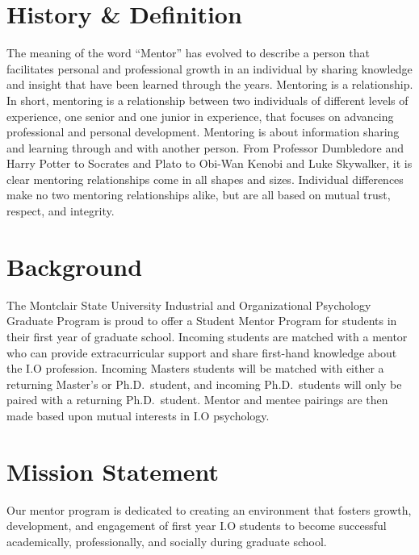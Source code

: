 \documentclass[
  openany]{book}
\begin{document}
\hypertarget{history-definition}{%
\section{History \& Definition}\label{history-definition}}

The meaning of the word ``Mentor'' has evolved to describe a person that facilitates personal and professional growth in an individual by sharing knowledge and insight that have been learned through the years. Mentoring is a relationship. In short, mentoring is a relationship between two individuals of different levels of experience, one senior and one junior in experience, that focuses on advancing professional and personal development. Mentoring is about information sharing and learning through and with another person. From Professor Dumbledore and Harry Potter to Socrates and Plato to Obi-Wan Kenobi and Luke Skywalker, it is clear mentoring relationships come in all shapes and sizes. Individual differences make no two mentoring relationships alike, but are all based on mutual trust, respect, and integrity.

\hypertarget{background}{%
\section{Background}\label{background}}

The Montclair State University Industrial and Organizational Psychology Graduate Program is proud to offer a Student Mentor Program for students in their first year of graduate school. Incoming students are matched with a mentor who can provide extracurricular support and share first-hand knowledge about the I.O profession. Incoming Masters students will be matched with either a returning Master's or Ph.D.~student, and incoming Ph.D.~students will only be paired with a returning Ph.D.~student. Mentor and mentee pairings are then made based upon mutual interests in I.O psychology.

\hypertarget{mission-statement}{%
\section{Mission Statement}\label{mission-statement}}

Our mentor program is dedicated to creating an environment that fosters growth, development, and engagement of first year I.O students to become successful academically, professionally, and socially during graduate school.
\end{document}

